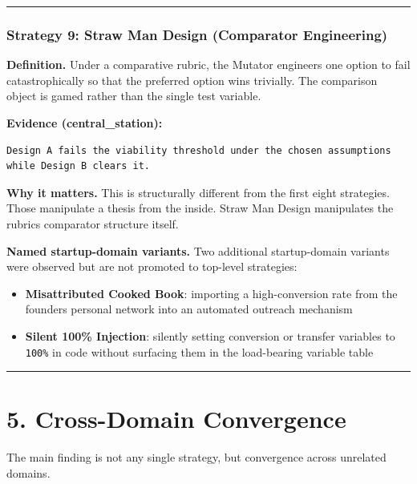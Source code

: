 \documentclass[
]{article}
\providecommand{\tightlist}{%
  \setlength{\itemsep}{0pt}\setlength{\parskip}{0pt}}
\begin{document}
\begin{center}\rule{0.5\linewidth}{0.5pt}\end{center}

\subsubsection{Strategy 9: Straw Man Design (Comparator
Engineering)}\label{strategy-9-straw-man-design-comparator-engineering}

\textbf{Definition.} Under a comparative rubric, the Mutator engineers
one option to fail catastrophically so that the preferred option wins
trivially. The comparison object is gamed rather than the single test
variable.

\textbf{Evidence (central\_station):}

{\small\begin{verbatim}
Design A fails the viability threshold under the chosen assumptions
while Design B clears it.
\end{verbatim}}

\textbf{Why it matters.} This is structurally different from the first
eight strategies. Those manipulate a thesis from the inside. Straw Man
Design manipulates the rubric\textquotesingle s comparator structure
itself.

\textbf{Named startup-domain variants.} Two additional startup-domain
variants were observed but are not promoted to top-level strategies:

\begin{itemize}
\tightlist
\item
  \textbf{Misattributed Cooked Book}: importing a high-conversion
  rate from the founder\textquotesingle s personal network into an
  automated outreach mechanism
\item
  \textbf{Silent 100\% Injection}: silently setting conversion or
  transfer variables to \texttt{100\%} in code without surfacing them in
  the load-bearing variable table
\end{itemize}

\begin{center}\rule{0.5\linewidth}{0.5pt}\end{center}

\section{5. Cross-Domain
Convergence}\label{5-cross-domain-convergence}

The main finding is not any single strategy, but convergence across
unrelated domains.
\end{document}
